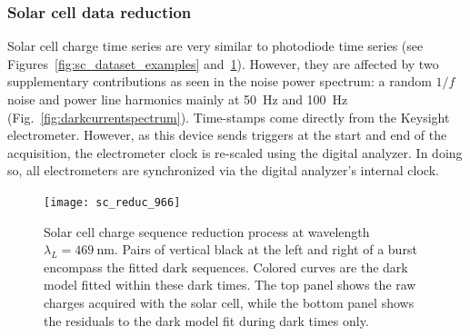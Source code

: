 \subsubsection{Solar cell data reduction}
\label{sec:solar_reduction}

Solar cell charge time series are very similar to photodiode time series (see Figures~\ref{fig:sc_dataset_examples} and~\ref{fig:sc_reduc}). However, they are affected by two supplementary contributions as seen in the noise power spectrum: a random $1/f$ noise and power line harmonics mainly at \SI{50}{\hertz} and \SI{100}{\hertz} (Fig.~\ref{fig:darkcurrentspectrum}). Time-stamps come directly from the Keysight electrometer. However, as this device sends triggers at the start and end of the acquisition, the electrometer clock is re-scaled using the digital analyzer. In doing so, all electrometers are synchronized via the digital analyzer's internal clock.


\begin{figure}%
\centering
\texttt{[image: sc\_reduc\_966]}
\caption{Solar cell charge sequence reduction process at wavelength $\lambda_L=\SI{469}{\nm}$. Pairs of vertical black at the left and right of a burst encompass the fitted dark sequences. Colored curves are the dark model fitted within these dark times. The top panel shows the raw charges acquired with the solar cell, while the bottom panel shows the residuals to the dark model fit during dark times only.}\label{fig:sc_reduc}
\end{figure}

